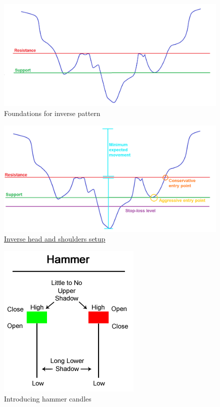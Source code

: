 \documentclass{article}
\begin{document}
\vspace{10pt}

\begin{figure}[!htb]
    \centering
    \includegraphics[width=\textwidth]{imgs/66.png}
    \caption{Foundations for inverse pattern}
\end{figure}

\vspace{10pt}

\begin{figure}[!htb]
    \centering
    \includegraphics[width=\textwidth]{imgs/67.png}
    \caption{\href{https://ninetonoonsecrets.com/imgs/67.png}{Inverse head and shoulders setup}}
\end{figure}

\vspace{10pt}

\begin{figure}[!htb]
    \centering
    \includegraphics[width=.56\textwidth]{imgs/68.png}
    \caption{Introducing hammer candles}
\end{figure}
\end{document}
